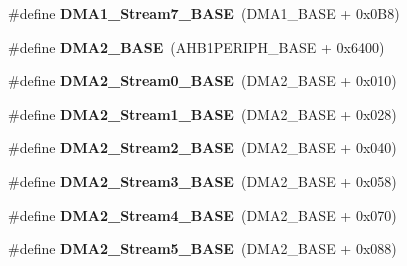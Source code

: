 \begin{DoxyCompactItemize}
\mbox{\label{group___peripheral__memory__map_ga82186dd6d3f60995d428b34c041919d7}} 
\#define {\bfseries D\+M\+A1\+\_\+\+Stream7\+\_\+\+B\+A\+SE}~(D\+M\+A1\+\_\+\+B\+A\+SE + 0x0\+B8)
\item 
\mbox{\label{group___peripheral__memory__map_gab72a9ae145053ee13d1d491fb5c1df64}} 
\#define {\bfseries D\+M\+A2\+\_\+\+B\+A\+SE}~(A\+H\+B1\+P\+E\+R\+I\+P\+H\+\_\+\+B\+A\+SE + 0x6400)
\item 
\mbox{\label{group___peripheral__memory__map_gac4c67b24726ba6b94d03adb351bcec4d}} 
\#define {\bfseries D\+M\+A2\+\_\+\+Stream0\+\_\+\+B\+A\+SE}~(D\+M\+A2\+\_\+\+B\+A\+SE + 0x010)
\item 
\mbox{\label{group___peripheral__memory__map_ga35512bdc3f5e9df4557c2fbe7935d0b1}} 
\#define {\bfseries D\+M\+A2\+\_\+\+Stream1\+\_\+\+B\+A\+SE}~(D\+M\+A2\+\_\+\+B\+A\+SE + 0x028)
\item 
\mbox{\label{group___peripheral__memory__map_gaed33a06f08188466f2ede06160984e9a}} 
\#define {\bfseries D\+M\+A2\+\_\+\+Stream2\+\_\+\+B\+A\+SE}~(D\+M\+A2\+\_\+\+B\+A\+SE + 0x040)
\item 
\mbox{\label{group___peripheral__memory__map_gaf3a9480e08c6ae94f4482e0cdaebdd17}} 
\#define {\bfseries D\+M\+A2\+\_\+\+Stream3\+\_\+\+B\+A\+SE}~(D\+M\+A2\+\_\+\+B\+A\+SE + 0x058)
\item 
\mbox{\label{group___peripheral__memory__map_gad1e67740e6301233473f64638145dd1f}} 
\#define {\bfseries D\+M\+A2\+\_\+\+Stream4\+\_\+\+B\+A\+SE}~(D\+M\+A2\+\_\+\+B\+A\+SE + 0x070)
\item 
\mbox{\label{group___peripheral__memory__map_gaed1460fdc407b6decfbffccb0260d0af}} 
\#define {\bfseries D\+M\+A2\+\_\+\+Stream5\+\_\+\+B\+A\+SE}~(D\+M\+A2\+\_\+\+B\+A\+SE + 0x088)
\item 
\mbox{\label{group___peripheral__memory__map_ga5e81174c96fd204fa7c82c815e85c8e6}} 

\end{DoxyCompactItemize}
